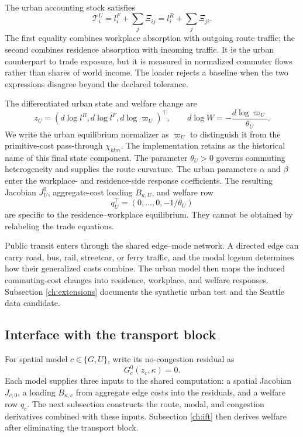 The urban accounting stock satisfies
\[
 \mathcal T_i^U
 =l_i^F+\sum_j\Xi_{ij}
 =l_i^R+\sum_j\Xi_{ji}.
\]
The first equality combines workplace absorption with outgoing route traffic;
the second combines residence absorption with incoming traffic. It is the
urban counterpart to trade exposure, but it is measured in normalized
commuter flows rather than shares of world income. The loader rejects a
baseline when the two expressions disagree beyond the declared tolerance.

The differentiated urban state and welfare change are
\[
 z_U=(d\log l^R,d\log l^F,d\log\varpi_U)^\top,
 \qquad
 d\log W=-\frac{d\log\varpi_U}{\theta_U}.
\]
We write the urban equilibrium normalizer as \(\varpi_U\) to distinguish it
from the primitive-cost pass-through \(\chi_{klm}\). The implementation retains
 as the historical name of this final state component.
The parameter \(\theta_U>0\) governs commuting heterogeneity and supplies the
route curvature. The urban parameters \(\alpha\) and \(\beta\) enter the
workplace- and residence-side response coefficients. The resulting Jacobian
\(J_U^0\), aggregate-cost loading \(B_{\kappa,U}\), and welfare row
\[
 q_U^\top=(0,\ldots,0,-1/\theta_U)
\]
are specific to the residence--workplace equilibrium. They cannot be obtained
by relabeling the trade equations.

Public transit enters through the shared edge--mode network. A directed edge
can carry road, bus, rail, streetcar, or ferry traffic, and the modal logsum
determines how their generalized costs combine. The urban model then maps
the induced commuting-cost changes into residence, workplace, and welfare
responses. Subsection \ref{ch:extensions} documents the synthetic urban test and
the Seattle data candidate.

\subsection{Interface with the transport block}

For spatial model \(c\in\{G,U\}\), write its no-congestion residual as
\[
 G_c^0(z_c,\kappa)=0.
\]
Each model supplies three inputs to the shared computation: a spatial
Jacobian \(J_{c,0}\), a loading \(B_{\kappa,c}\) from aggregate edge costs into
the residuals, and a welfare row \(q_c\). The next subsection constructs the
route, modal, and congestion derivatives combined with these inputs.
Subsection \ref{ch:ift} then derives welfare after eliminating the transport
block.
